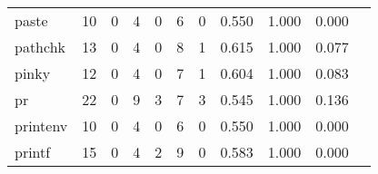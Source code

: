 \begin{longtable}{lp{1.20cm}p{1.20cm}p{1.20cm}p{1.20cm}p{1.20cm}p{1.20cm}p{1.20cm}p{1.20cm}p{1.20cm}p{1.20cm}}
paste     &                                    10 &                                                  0 &                                                  4 &                                                  0 &                                                  6 &                                                  0 &                                         0.550 &                                              1.000 &                                              0.000 \\
pathchk   &                                    13 &                                                  0 &                                                  4 &                                                  0 &                                                  8 &                                                  1 &                                         0.615 &                                              1.000 &                                              0.077 \\
pinky     &                                    12 &                                                  0 &                                                  4 &                                                  0 &                                                  7 &                                                  1 &                                         0.604 &                                              1.000 &                                              0.083 \\
pr        &                                    22 &                                                  0 &                                                  9 &                                                  3 &                                                  7 &                                                  3 &                                         0.545 &                                              1.000 &                                              0.136 \\
printenv  &                                    10 &                                                  0 &                                                  4 &                                                  0 &                                                  6 &                                                  0 &                                         0.550 &                                              1.000 &                                              0.000 \\
printf    &                                    15 &                                                  0 &                                                  4 &                                                  2 &                                                  9 &                                                  0 &                                         0.583 &                                              1.000 &                                              0.000 \\

\end{longtable}
